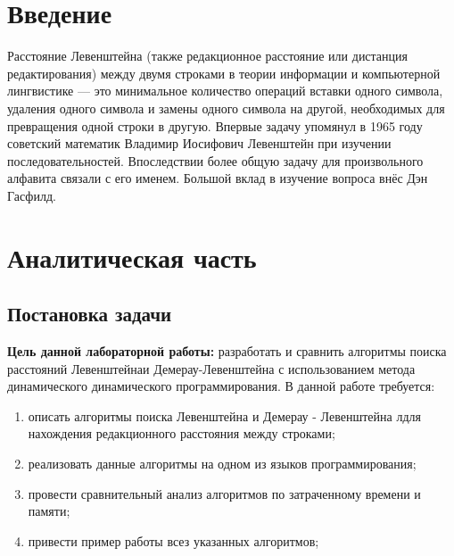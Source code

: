 \documentclass[a4paper]{article}
\begin{document}

	\section*{Введение}Расстояние Левенштейна (также редакционное расстояние или дистанция редактирования) между двумя строками в теории информации и компьютерной лингвистике — это минимальное количество операций вставки одного символа, удаления одного символа и замены одного символа на другой, необходимых для превращения одной строки в другую.
	Впервые задачу упомянул в 1965 году советский математик Владимир Иосифович Левенштейн при изучении последовательностей. Впоследствии более общую задачу для произвольного алфавита связали с его именем. Большой вклад в изучение вопроса внёс Дэн Гасфилд.
	\section{Аналитическая часть}
	\subsection{Постановка задачи}
	{\bf Цель данной лабораторной работы:} разработать и сравнить алгоритмы поиска расстояний Левенштейнаи Демерау-Левенштейна с использованием метода динамического динамического программирования.
	\newline
	В данной работе требуется:
	\begin{enumerate}
		\item описать алгоритмы поиска Левенштейна и Демерау - Левенштейна лдля нахождения редакционного расстояния между строками;
		\item реализовать данные алгоритмы на одном из языков программирования;
		\item провести сравнительный анализ алгоритмов по затраченному времени и памяти;
		\item привести пример работы всез указанных алгоритмов;
	\end{enumerate}
\end{document}
